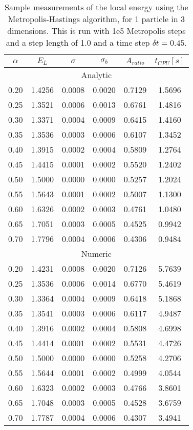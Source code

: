 \documentclass[
    a4paper, aps, twocolumn, floatfix, superscriptaddress,
    nofootinbib]{revtex4-1}
\begin{document}
\begin{table}[h!]
\caption{Sample measurements of the local energy using the Metropolis-Hastings algorithm, for 1 particle in 3 dimensions. This is run with 1e5 Metropolis steps and a step length of 1.0 and a time step $\delta t = 0.45$.}
\label{tab:c_importance_sampling_1part_3dim}

\centering
\begin{ruledtabular}
\begin{tabular}{cccccc}
$\alpha$ & $E_L$  & $\sigma$ & $\sigma_b$ & $A_{ratio}$ & $t_{CPU}[\si{s}]$  \\
\hline
          \multicolumn{6}{c}{Analytic}\\
\hline

0.20 &1.4256 &0.0008 &0.0020 &0.7129 &1.5696 \\
0.25 &1.3521 &0.0006 &0.0013 &0.6761 &1.4816 \\
0.30 &1.3371 &0.0004 &0.0009 &0.6415 &1.4160 \\
0.35 &1.3536 &0.0003 &0.0006 &0.6107 &1.3452 \\
0.40 &1.3915 &0.0002 &0.0004 &0.5809 &1.2764 \\
0.45 &1.4415 &0.0001 &0.0002 &0.5520 &1.2402 \\
0.50 &1.5000 &0.0000 &0.0000 &0.5257 &1.2024 \\
0.55 &1.5643 &0.0001 &0.0002 &0.5007 &1.1300 \\
0.60 &1.6326 &0.0002 &0.0003 &0.4761 &1.0480 \\
0.65 &1.7051 &0.0003 &0.0005 &0.4525 &0.9942 \\
0.70 &1.7796 &0.0004 &0.0006 &0.4306 &0.9484 \\ 
\hline
         \multicolumn{6}{c}{Numeric}                                                     \\
\hline

0.20 &1.4231 &0.0008 &0.0020 &0.7126 &5.7639 \\ 
0.25 &1.3536 &0.0006 &0.0014 &0.6770 &5.4619 \\ 
0.30 &1.3364 &0.0004 &0.0009 &0.6418 &5.1868 \\ 
0.35 &1.3541 &0.0003 &0.0006 &0.6117 &4.9487 \\ 
0.40 &1.3916 &0.0002 &0.0004 &0.5808 &4.6998 \\ 
0.45 &1.4414 &0.0001 &0.0002 &0.5531 &4.4726 \\ 
0.50 &1.5000 &0.0000 &0.0000 &0.5258 &4.2706 \\ 
0.55 &1.5644 &0.0001 &0.0002 &0.4999 &4.0544 \\ 
0.60 &1.6323 &0.0002 &0.0003 &0.4766 &3.8601 \\ 
0.65 &1.7048 &0.0003 &0.0005 &0.4528 &3.6759 \\ 
0.70 &1.7787 &0.0004 &0.0006 &0.4307 &3.4941
\end{tabular}
\end{ruledtabular}
\end{table}
\end{document}
